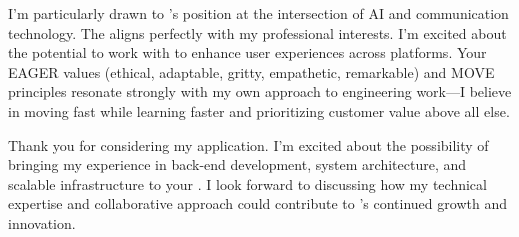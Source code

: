 I'm particularly drawn to \COMPANY's position at the intersection of AI and communication technology. The \SPECIFICREASON{} aligns perfectly with my professional interests. I'm excited about the potential to work with \RELEVANTTECHNOLOGY{} to enhance user experiences across platforms. Your EAGER values (ethical, adaptable, gritty, empathetic, remarkable) and MOVE principles resonate strongly with my own approach to engineering work—I believe in moving fast while learning faster and prioritizing customer value above all else.
\vspace{0.2cm}

Thank you for considering my application. I'm excited about the possibility of bringing my experience in back-end development, system architecture, and scalable infrastructure to your \TEAMNAME. I look forward to discussing how my technical expertise and collaborative approach could contribute to \COMPANY's continued growth and innovation.
